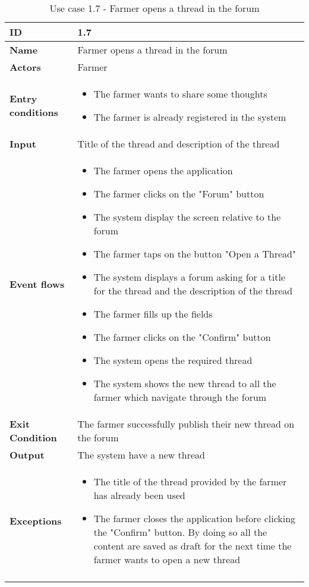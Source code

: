 \begin{longtable}[H]{ | l | p{10cm} | }
\hline
{\cellcolor[rgb]{0.753,0.753,0.753}}\textbf{ID}  & 1.7 \\ \hline
{\cellcolor[rgb]{0.753,0.753,0.753}}\textbf{Name} & Farmer opens a thread in the forum \\ \hline
{\cellcolor[rgb]{0.753,0.753,0.753}}\textbf{Actors} & Farmer \\ \hline
{\cellcolor[rgb]{0.753,0.753,0.753}}\textbf{Entry conditions} &
\begin{itemize}
    \item The farmer wants to share some thoughts
    \item The farmer is already registered in the system
\end{itemize}
\\ \hline
{\cellcolor[rgb]{0.753,0.753,0.753}}\textbf{Input} & Title of the thread and description of the thread\\ \hline
{\cellcolor[rgb]{0.753,0.753,0.753}}\textbf{Event flows} &
\begin{itemize}
    \item The farmer opens the application
    \item The farmer clicks on the "Forum" button
    \item The system display the screen relative to the forum
    \item The farmer taps on the button "Open a Thread"
    \item The system displays a forum asking for a title for the thread and the description of the thread
    \item The farmer fills up the fields
    \item The farmer clicks on the "Confirm" button
    \item The system opens the required thread
    \item The system shows the new thread to all the farmer which navigate through the forum
\end{itemize}
\\ \hline
{\cellcolor[rgb]{0.753,0.753,0.753}}\textbf{Exit Condition} & The farmer successfully publish their new thread on the forum\\ \hline
{\cellcolor[rgb]{0.753,0.753,0.753}}\textbf{Output} & 
The system have a new thread
\\ \hline
{\cellcolor[rgb]{0.753,0.753,0.753}}\textbf{Exceptions} & 
\begin{itemize}
    \item The title of the thread provided by the farmer has already been used
    \item The farmer closes the application before clicking the "Confirm" button. By doing so all the content are saved as draft for the next time the farmer wants to open a new thread 

\end{itemize}
\\ \hline
\caption{Use case 1.7 - Farmer opens a thread in the forum}
\\
\end{longtable}